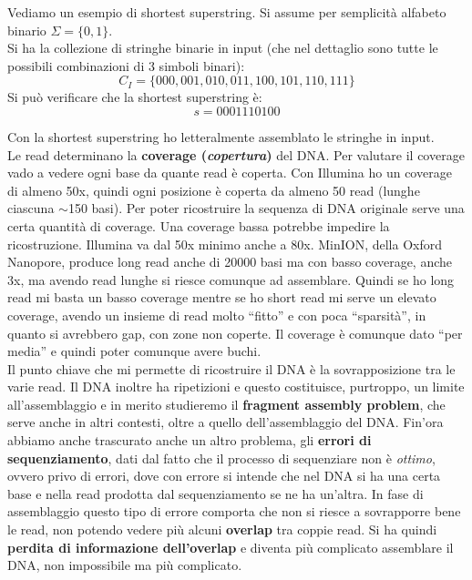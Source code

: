 \documentclass[a4paper,12pt, oneside]{book}
\begin{document}
\begin{esempio}
  Vediamo un esempio di shortest superstring. Si assume per semplicità alfabeto
  binario $\Sigma=\{0,1\}$.\\
  Si ha la collezione di stringhe binarie in input (che nel dettaglio sono tutte
  le possibili combinazioni di 3 simboli binari):
  \[C_I=\{000,001,010,011,100,101,110,111\}\]
  Si può verificare che la shortest superstring è:
  \[s=0001110100\]
\end{esempio}
Con la shortest superstring ho letteralmente assemblato le stringhe in input.\\
Le read determinano la \textbf{coverage (\textit{copertura})} del DNA. Per
valutare il coverage vado a vedere ogni base da quante read è coperta. Con
Illumina ho un coverage di almeno 50x, quindi ogni posizione è coperta da almeno
50 read (lunghe ciascuna $\sim$150 basi). Per poter ricostruire la sequenza di
DNA originale serve una certa quantità di coverage. Una coverage bassa potrebbe
impedire la ricostruzione. Illumina va dal 50x minimo anche a 80x.
MinION, della Oxford Nanopore, produce long read anche di 20000 basi ma con
basso coverage, anche 3x, ma avendo read lunghe si riesce comunque ad
assemblare. Quindi se ho long read mi basta un basso coverage mentre se ho short
read mi serve un elevato coverage, avendo un insieme di read molto ``fitto'' e
con poca ``sparsità'', in quanto si avrebbero gap, con zone non coperte. Il
coverage è comunque dato ``per media'' e quindi poter comunque avere buchi.\\
Il punto chiave che mi permette di ricostruire il DNA è la sovrapposizione tra
le varie read. Il DNA inoltre ha ripetizioni e questo costituisce, purtroppo, un
limite all'assemblaggio e in merito studieremo il \textbf{fragment assembly
  problem}, che serve anche in altri contesti, oltre a quello dell'assemblaggio
del DNA. Fin'ora abbiamo anche trascurato anche un altro problema, gli
\textbf{errori di sequenziamento}, dati dal fatto che il processo di sequenziare
non è \textit{ottimo}, ovvero privo di errori, dove con errore si intende che
nel DNA si ha una certa base e nella read prodotta dal sequenziamento se ne ha
un'altra. In fase di assemblaggio questo tipo di errore comporta che non si
riesce a sovrapporre bene le read, non potendo vedere più alcuni
\textbf{overlap} tra coppie read. Si ha quindi \textbf{perdita di informazione
  dell'overlap} e diventa più complicato assemblare il DNA, non impossibile ma
più complicato.
\end{document}
